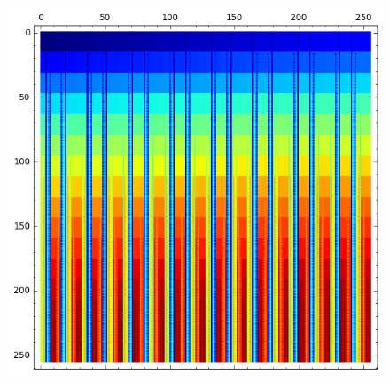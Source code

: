 \documentclass[12pt,a4paper]{article}
\begin{document}
\begin{figure}[!ht]
\begin{minipage}{.48\textwidth}
\includegraphics[width=.9\linewidth]{../matrix_plot/cast128_6_17_bent_cayley_graph_index_matrix.png}
  \label{fig:cast128_6_17_bent_cayley_graph_index_matrix}
\end{minipage}%
\end{figure}
\end{document}
